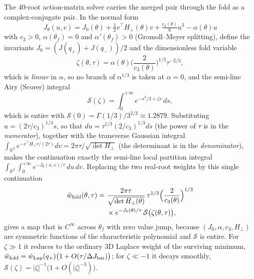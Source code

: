 \begin{proposition}\label{prop:q5c}
The 40-root action-matrix solver carries the merged pair through the fold as a complex-conjugate pair. In the normal form
\begin{equation}
J_\theta(u,v)=J_0(\theta)+\tfrac12v^\top H_\perp(\theta)v+\tfrac{c_3(\theta)}{6}u^3-\alpha(\theta)u
\label{eq:normalform}
\end{equation}
with $c_3>0$, $\alpha(\theta_f)=0$ and $\alpha'(\theta_f)>0$ (Gromoll--Meyer splitting), define the invariants $J_0=(J(q_+)+J(q_-))/2$ and the dimensionless fold variable
\begin{equation}
\zeta(\theta,\tau)=\alpha(\theta)\Big(\frac{2}{c_3(\theta)}\Big)^{1/3}\tau^{-2/3},
\label{eq:zeta}
\end{equation}
which is \emph{linear} in $\alpha$, so no branch of $\alpha^{1/3}$ is taken at $\alpha=0$, and the semi-line Airy (Scorer) integral
\begin{equation}
\mathcal{S}(\zeta)=\int_0^{+\infty}e^{-s^3/3+\zeta s}\,ds,
\label{eq:scorer}
\end{equation}
which is entire with $\mathcal{S}(0)=\Gamma(1/3)/3^{2/3}\approx1.2879$. Substituting $u=(2\tau/c_3)^{1/3}s$, so that $du=\tau^{1/3}(2/c_3)^{1/3}ds$ (the power of $\tau$ is in the \emph{numerator}), together with the transverse Gaussian integral $\int_{\mathbb{R}^2}e^{-v^\top H_\perp v/(2\tau)}dv=2\pi\tau/\sqrt{\det H_\perp}$ (the determinant is in the \emph{denominator}), makes the continuation exactly the semi-line local partition integral $\int_{\mathbb{R}^2}\int_0^{+\infty}e^{-J_\theta(u,v)/\tau}\,du\,dv$. Replacing the two real-root weights by this single continuation
\begin{equation}
\begin{split}
\tilde w_{\rm fold}(\theta,\tau)={}&\frac{2\pi\tau}{\sqrt{\det H_\perp(\theta)}}\,\tau^{1/3}\Big(\frac{2}{c_3(\theta)}\Big)^{1/3}\\
&\times e^{-J_0(\theta)/\tau}\,\mathcal{S}\big(\zeta(\theta,\tau)\big),
\end{split}
\label{eq:foldweight}
\end{equation}
gives a map that is $C^\infty$ across $\theta_f$ with zero value jump, because $(J_0,\alpha,c_3,H_\perp)$ are symmetric functions of the characteristic polynomial and $\mathcal{S}$ is entire. For $\zeta\gg1$ it reduces to the ordinary 3D Laplace weight of the surviving minimum, $\tilde w_{\rm fold}=\tilde w_{\rm Lap}(q_+)\big(1+O(\tau/\Delta J_{\rm bar})\big)$; for $\zeta\ll-1$ it decays smoothly, $\mathcal{S}(\zeta)=|\zeta|^{-1}\big(1+O(|\zeta|^{-3})\big)$.
\end{proposition}

